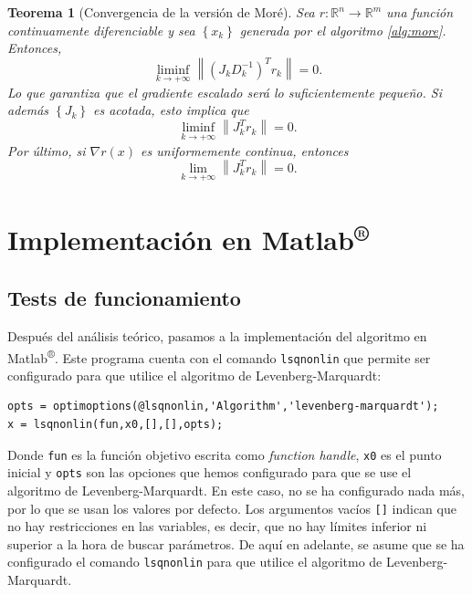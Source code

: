 \documentclass[11pt,a4paper]{book}
\newtheorem{theorem}{Teorema}[chapter]
\theoremstyle{definition}
\theoremstyle{remark}
\newcommand{\norm}[1]{\left\lVert#1\right\rVert}
\newcommand{\sucesionxk}{\left\{x_k\right\}}
\newcommand{\sucesion}[1]{\left\{#1\right\}}
\def\code#1{\texttt{#1}}
\begin{document}
\begin{theorem}[Convergencia de la versión de Moré]\label{th:more}
	Sea $r:\mathbb{R}^n \to \mathbb{R}^m$ una función continuamente diferenciable y
	sea $\sucesionxk$ generada por el algoritmo \ref{alg:more}. Entonces,
	\begin{equation}
		\liminf_{k\to +\infty} \norm{(J_kD_k^{-1})^Tr_k} = 0.
	\end{equation}
	Lo que garantiza que el gradiente escalado será lo suficientemente pequeño.
	Si además $\sucesion{J_k}$ es acotada, esto implica que
	\begin{equation}
		\liminf_{k\to +\infty} \norm{J_k^Tr_k} = 0.
	\end{equation}
	Por último, si $\nabla r(x)$ es uniformemente continua, entonces
	\begin{equation}
		\lim_{k\to +\infty} \norm{J_k^Tr_k} = 0.
	\end{equation}
\end{theorem}

\chapter{Implementación en Matlab\textsuperscript{®}}

\section{Tests de funcionamiento}

Después del análisis teórico, pasamos a la implementación del algoritmo en Matlab\textsuperscript{®}.
Este programa cuenta con el comando \code{lsqnonlin} \cite{lsqnonlin} que permite ser
configurado para que utilice el algoritmo de Levenberg-Marquardt:

\begin{lstlisting}[style=Matlab-editor]
opts = optimoptions(@lsqnonlin,'Algorithm','levenberg-marquardt');
x = lsqnonlin(fun,x0,[],[],opts);
\end{lstlisting}
Donde \code{fun} es la función objetivo escrita como \textit{function handle}, \code{x0} es el punto inicial y \code{opts} son las opciones que hemos configurado para que se use el algoritmo de Levenberg-Marquardt. En este caso, no se ha configurado nada más, por lo que se usan los valores por defecto. Los argumentos vacíos \code{[]} indican que no hay restricciones en las variables, es decir, que no hay límites inferior ni superior a la hora de buscar parámetros. De aquí en adelante, se asume que se ha configurado el comando \code{lsqnonlin} para que utilice el algoritmo de Levenberg-Marquardt.
\end{document}

